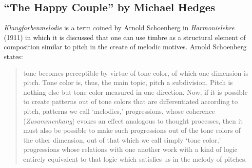 \documentclass{tufte-handout}
\begin{document}
\subsection*{``The Happy Couple'' by Michael Hedges}
\emph{Klangfarbenmelodie} is a term coined by Arnold Schoenberg in
\emph{Harmonielehre} (1911) in which it is discussed that one can use timbre
as a structural element of composition similar to pitch in the create of
melodic motives. Arnold Schoenberg states:
\begin{quote}
  tone becomes perceptible by virtue of tone color, of which one dimension is
  pitch. Tone color is, thus, the main topic, pitch a subdivision. Pitch is
  nothing else but tone color measured in one direction. Now, if it is
  possible to create patterns out of tone colors that are differentiated
  according to pitch, patterns we call `melodies,' progressions, whose
  coherence (\emph{Zusammenhang}) evokes an effect analogous to thought
  processes, then it must also be possible to make such progressions out of
  the tone colors of the other dimension, out of that which we call simply
  `tone color,' progressions whose relations with one another work with a kind
  of logic entirely equivalent to that logic which satisfies us in the melody
  of pitches.
\end{quote}
\end{document}
